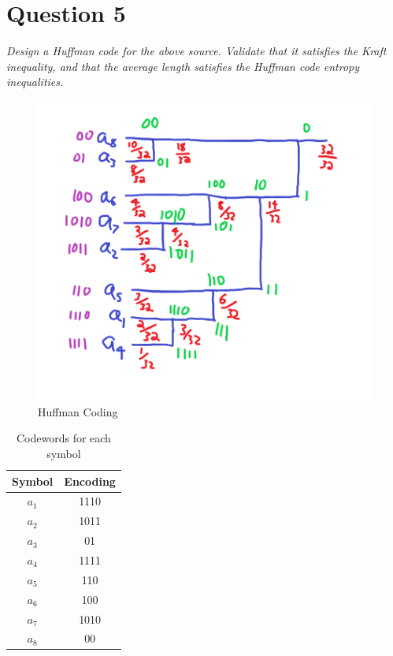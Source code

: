 \documentclass[12pt]{report}
\begin{document}
\newpage

\section*{Question 5}
\textit{Design a Huffman code for the above source. Validate that it satisfies the Kraft inequality,
and that the average length satisfies the Huffman code entropy inequalities.} \\

\begin{figure}[H]
    \begin{center}
        \includegraphics[scale=0.5]{Huffman.png}
        \caption{Huffman Coding}
    \end{center}
\end{figure}

\begin{table}[H]
    \centering
    \begin{tabular}{| c | c |} \hline
        Symbol & Encoding   \\ \hline
        $a_1$ & 1110        \\ \hline
        $a_2$ & 1011        \\ \hline
        $a_3$ & 01          \\ \hline
        $a_4$ & 1111        \\ \hline
        $a_5$ & 110         \\ \hline
        $a_6$ & 100         \\ \hline
        $a_7$ & 1010        \\ \hline
        $a_8$ & 00          \\ \hline
    \end{tabular}
    \caption{Codewords for each symbol}
    \label{tab:Huffman}
\end{table}
\end{document}
